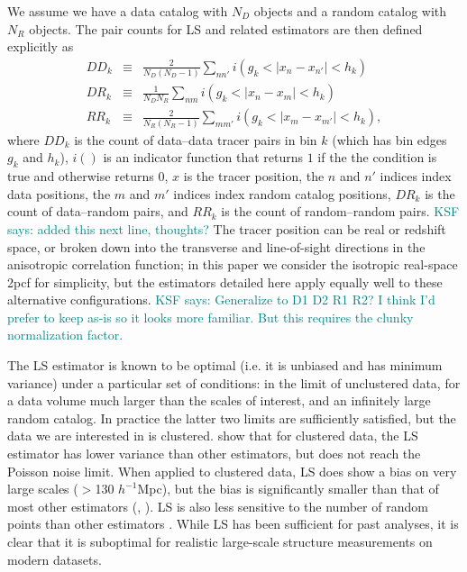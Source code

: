 \documentclass[modern]{aastex62}
\newcommand{\cf}{2pcf\xspace} %
\newcommand{\LS}{LS\xspace}
\newcommand{\hmpc}{$h^{-1}$Mpc}
\newcommand{\KSF}[1]{\textcolor{teal}{KSF says: #1}}
\begin{document}
We assume we have a data catalog with $N_D$ objects and a random catalog with $N_R$ objects.
The pair counts for \LS and related estimators are then defined explicitly as
\begin{eqnarray}\displaystyle
DD_k &\equiv& \frac{2}{N_D(N_D-1)} \sum_{n n'} i(g_k < |x_n - x_{n'}| < h_k) \\
DR_k &\equiv& \frac{1}{N_D N_R} \sum_{n m} i(g_k < |x_n - x_m| < h_k) \\
RR_k &\equiv& \frac{2}{N_R(N_R-1)} \sum_{m m'} i(g_k < |x_m - x_{m'}| < h_k),
\end{eqnarray}
where $DD_k$ is the count of data--data tracer pairs in bin $k$ (which has bin edges $g_k$ and $h_k$), $i()$ is an indicator function that returns $1$ if the the condition is true and otherwise returns $0$, $x$ is the tracer position, the $n$ and $n'$ indices index data positions, the $m$ and $m'$ indices index random catalog positions, $DR_k$ is the count of data--random pairs, and $RR_k$ is the count of random--random pairs.
\KSF{added this next line, thoughts?}
The tracer position can be real or redshift space, or broken down into the transverse and line-of-sight directions in the anisotropic correlation function; in this paper we consider the isotropic real-space \cf for simplicity, but the estimators detailed here apply equally well to these alternative configurations.
\KSF{Generalize to D1 D2 R1 R2? I think I'd prefer to keep as-is so it looks more familiar. But this requires the clunky normalization factor.} 

The \LS estimator is known to be optimal (i.e. it is unbiased and has minimum variance) under a particular set of conditions: in the limit of unclustered data, for a data volume much larger than the scales of interest, and an infinitely large random catalog. 
In practice the latter two limits are sufficiently satisfied, but the data we are interested in is clustered.
\cite{VargasMagana2013} show that for clustered data, the \LS estimator has lower variance than other estimators, but does not reach the Poisson noise limit.
When applied to clustered data, \LS does show a bias on very large scales ($>$130 \hmpc), but the bias is significantly smaller than that of most other estimators (\citealt{Kerscher1999}, \citealt{VargasMagana2013}).
\LS is also less sensitive to the number of random points than other estimators \citep{Kerscher2000}.
While \LS has been sufficient for past analyses, it is clear that it is suboptimal for realistic large-scale structure measurements on modern datasets.
\end{document}
